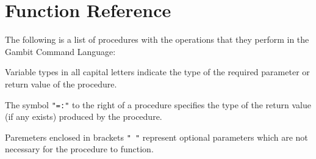 \section{Function Reference}

The following is a list of procedures with the operations that they
perform in the Gambit Command Language:

Variable types in all capital letters indicate the type of the
required parameter or return value of the procedure.

The symbol {\tt "=:"} to the right of a procedure specifies the type
of the return value (if any exists) produced by the procedure.

Paremeters enclosed in brackets {\tt "{ }"} represent optional
parameters which are not necessary for the procedure to function.

